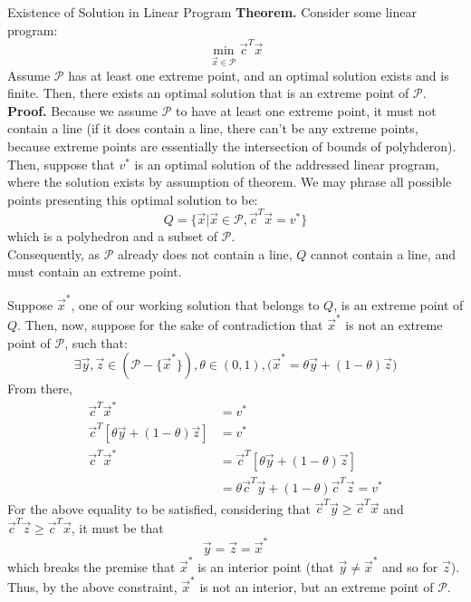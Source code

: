 \begin{ln-theorem}{Existence of Solution in Linear Program}{}
    \textbf{Theorem.}
    Consider some linear program:
    \[
        \min_{\vec{x} \in \mathcal{P}} \vec{c}^T \vec{x}
    \]
    Assume $\mathcal{P}$ has at least one extreme point, and an optimal solution exists and is finite.
    Then, there exists an optimal solution that is an extreme point of $\mathcal{P}$.
    \tcblower
    \textbf{Proof.}
    Because we assume $\mathcal{P}$ to have at least one extreme point, it must not contain a line (if it does contain a line, there can't be any extreme points, because extreme points are essentially the intersection of bounds of polyhderon). \\
    Then, suppose that $v^*$ is an optimal solution of the addressed linear program, where the solution exists by assumption of theorem.
    We may phrase all possible points presenting this optimal solution to be:
    \[
        Q = \{\vec{x} | \vec{x} \in \mathcal{P}, \vec{c}^T \vec{x} = v^*\}
    \]
    which is a polyhedron and a subset of $\mathcal{P}$. \\
    Consequently, as $\mathcal{P}$ already does not contain a line, $Q$ cannot contain a line, and must contain an extreme point.

    Suppose $\vec{x}^*$, one of our working solution that belongs to $Q$, is an extreme point of $Q$.
    Then, now, suppose for the sake of contradiction that $\vec{x}^*$ is not an extreme point of $\mathcal{P}$, such that:
    \[
        \exists \vec{y}, \vec{z} \in (\mathcal{P} - \{\vec{x}^*\}), \theta \in (0, 1), \big( \vec{x}^* = \theta \vec{y} + (1 - \theta) \vec{z} \big)
    \]
    From there, 
    \begin{align*}
        \vec{c}^T \vec{x}^* &= v^* \\
        \vec{c}^T [\theta \vec{y} + (1 - \theta) \vec{z}] &= v^* \\
        \vec{c}^T \vec{x}^*
        &= \vec{c}^T [\theta \vec{y} + (1 - \theta) \vec{z}] \\
        &= \theta \vec{c}^T \vec{y} + (1 - \theta) \vec{c}^T \vec{z} = v^*
    \end{align*}
    For the above equality to be satisfied, considering that $\vec{c}^T \vec{y} \geq \vec{c}^T \vec{x}$ and $\vec{c}^T \vec{z} \geq \vec{c}^T \vec{x}$, it must be that
    \[
        \vec{y} = \vec{z} = \vec{x}^*
    \]
    which breaks the premise that $\vec{x}^*$ is an interior point (that $\vec{y} \neq \vec{x}^*$ and so for $\vec{z}$). \\
    Thus, by the above constraint, $\vec{x}^*$ is not an interior, but an extreme point of $\mathcal{P}$.
\end{ln-theorem}

